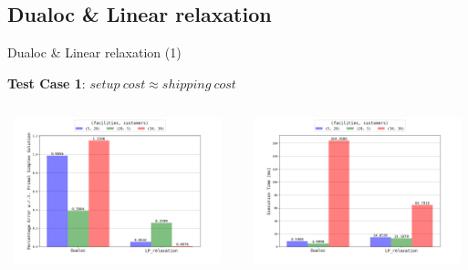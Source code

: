 \documentclass{beamer}
\begin{document}
        \subsection{Dualoc \& Linear relaxation}
	
	    \begin{frame}{Dualoc \& Linear relaxation (1)}
	  
	  \textbf{Test Case 1}: $setup \ cost \approx shipping \ cost$
  
	   \begin{columns}
	   \centering
        \includegraphics[width=6.5cm,height=4.2cm]{img/chart_error_0.png}
        
        \centering
        \includegraphics[width=6.5cm,height=4.2cm]{img/chart_time_0.png}
        \end{columns}
	   
	    \end{frame}
	       
\end{document}
